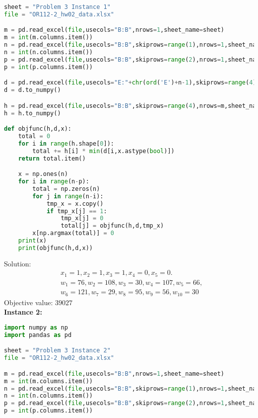 \documentclass[12pt]{article}
\begin{document}
\begin{enumerate}
\begin{enumerate}
\begin{lstlisting}[language=Python]
sheet = "Problem 3 Instance 1"
file = "OR112-2_hw02_data.xlsx"

m = pd.read_excel(file,usecols="B:B",nrows=1,sheet_name=sheet)
m = int(m.columns.item())
n = pd.read_excel(file,usecols="B:B",skiprows=range(1),nrows=1,sheet_name=sheet)
n = int(n.columns.item())
p = pd.read_excel(file,usecols="B:B",skiprows=range(2),nrows=1,sheet_name=sheet)
p = int(p.columns.item())

d = pd.read_excel(file,usecols="E:"+chr(ord('E')+n-1),skiprows=range(4),nrows=m,sheet_name=sheet)
d = d.to_numpy()

h = pd.read_excel(file,usecols="B:B",skiprows=range(4),nrows=m,sheet_name=sheet)
h = h.to_numpy()

def objfunc(h,d,x):
    total = 0
    for i in range(h.shape[0]):
        total += h[i] * min(d[i,x.astype(bool)])
    return total.item()

    x = np.ones(n)
    for i in range(n-p):
        total = np.zeros(n)
        for j in range(n-i):
            tmp_x = x.copy()
            if tmp_x[j] == 1:
                tmp_x[j] = 0
                total[j] = objfunc(h,d,tmp_x)
        x[np.argmax(total)] = 0
    print(x)
    print(objfunc(h,d,x))    
                        \end{lstlisting}
                        Solution:
                        \begin{align*}
                               & x_1 = 1, x_2 = 1, x_3 = 1, x_4 = 0, x_5 = 0.         \\
                               & w_1 = 76, w_2 = 108, w_3 = 30, w_4 = 107, w_5 = 66,  \\
                               & w_6 = 121, w_7 = 29, w_8 = 95, w_9 = 56, w_{10} = 30
                        \end{align*}
                        Objective value:  $39027$\\
                        \textbf{Instance 2:}
                        \begin{lstlisting}[language=Python]
import numpy as np
import pandas as pd

sheet = "Problem 3 Instance 2"
file = "OR112-2_hw02_data.xlsx"

m = pd.read_excel(file,usecols="B:B",nrows=1,sheet_name=sheet)
m = int(m.columns.item())
n = pd.read_excel(file,usecols="B:B",skiprows=range(1),nrows=1,sheet_name=sheet)
n = int(n.columns.item())
p = pd.read_excel(file,usecols="B:B",skiprows=range(2),nrows=1,sheet_name=sheet)
p = int(p.columns.item())


\end{lstlisting}
\end{enumerate}
\end{enumerate}
\end{document}
